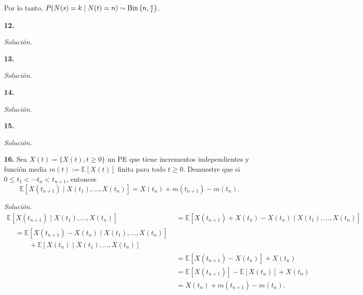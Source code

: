 \documentclass[12pt]{article}
\newcommand{\E}{\mathbb{E}}
\begin{document}
Por lo tanto, $ P(N(s) = k \mid N(t) = n) \sim \textnormal{Bin} \left(n, \frac{s}{t} \right)$.

\begin{tcolorbox}[colback=blue!5!white, colframe=blue!5!white, arc=0mm, boxrule=0pt]
    \textbf{12.} 
\end{tcolorbox} 

\textit{Solución}.

\begin{tcolorbox}[colback=blue!5!white, colframe=blue!5!white, arc=0mm, boxrule=0pt]
    \textbf{13.} 
\end{tcolorbox} 

\textit{Solución}.

\begin{tcolorbox}[colback=blue!5!white, colframe=blue!5!white, arc=0mm, boxrule=0pt]
    \textbf{14.} 
\end{tcolorbox} 

\textit{Solución}.

\begin{tcolorbox}[colback=blue!5!white, colframe=blue!5!white, arc=0mm, boxrule=0pt]
    \textbf{15.} 
\end{tcolorbox} 

\textit{Solución}.

\begin{tcolorbox}[colback=blue!5!white, colframe=blue!5!white, arc=0mm, boxrule=0pt]
    \textbf{16.} Sea $X(t) = \{X(t), t \geq 0\}$ un PE que tiene incrementos independientes y función media $m(t) := \E[X(t)]$ finita para todo $t\geq 0$. Demuestre que si $0 \leq t_1 < \cdots t_n < t_{n+1}$, entonces
    \[ \E[X(t_{n+1}) \mid X(t_1), \ldots, X(t_n)] = X(t_n) + m(t_{n+1}) - m(t_n). \]
\end{tcolorbox} 

\noindent
\textit{Solución}. 
\begin{align*}
    \E[X(t_{n+1}) \mid X(t_1), \ldots, X(t_n)] &= \E[X(t_{n+1}) + X(t_n) - X(t_n) \mid X(t_1), \ldots, X(t_n)] \\
    \begin{split}
    &= \E[X(t_{n+1}) - X(t_n) \mid X(t_1), \ldots, X(t_n)] \\
        & \quad \quad + \E[X(t_n)\mid X(t_1), \ldots, X(t_n)]
    \end{split}  \\
    &= \E[X(t_{n+1}) - X(t_n)] + X(t_n) \\
    &= \E[X(t_{n+1})] - \E[X(t_n)] + X(t_n) \\
    &= X(t_n) + m(t_{n+1}) - m(t_n).
\end{align*}
\end{document}
